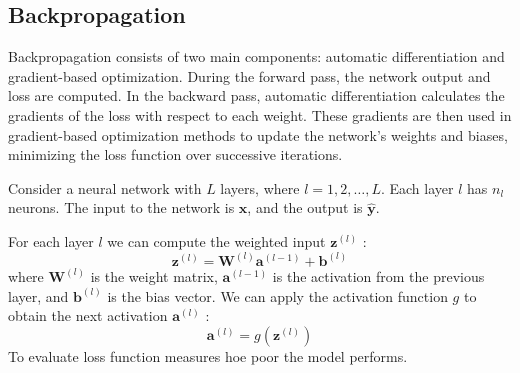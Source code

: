 

\subsection{Backpropagation}
Backpropagation consists of two main components: automatic differentiation and gradient-based optimization. During the forward pass, the network output and loss are computed. In the backward pass, automatic differentiation calculates the gradients of the loss with respect to each weight. These gradients are then used in gradient-based optimization methods to update the network's weights and biases, minimizing the loss function over successive iterations.

Consider a neural network with $L$ layers, where $l=1,2, \ldots, L$. Each layer $l$ has $n_l$ neurons. The input to the network is $\mathbf{x}$, and the output is $\hat{\mathbf{y}}$.

For each layer $l$ we can compute the weighted input $\mathbf{z}^{(l)}$ :
$$
\mathbf{z}^{(l)}=\mathbf{W}^{(l)} \mathbf{a}^{(l-1)}+\mathbf{b}^{(l)}
$$
where $\mathbf{W}^{(l)}$ is the weight matrix, $\mathbf{a}^{(l-1)}$ is the activation from the previous layer, and $\mathbf{b}^{(l)}$ is the bias vector. We can apply the activation function $g$ to obtain the next activation $\mathbf{a}^{(l)}$ :
$$
\mathbf{a}^{(l)}=g\left(\mathbf{z}^{(l)}\right)
$$
To evaluate  loss function measures hoe poor the model performs.

